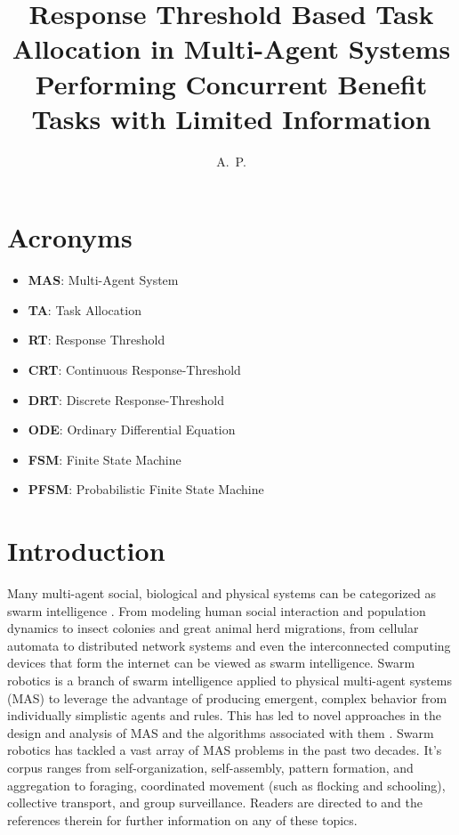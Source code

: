 \documentclass[defaultstyle,12pt]{thesis}
\title{Response Threshold Based Task Allocation in Multi-Agent Systems Performing Concurrent Benefit Tasks with Limited Information}
\author{A.~P.}{Kanakia}
\begin{document}
\chapter*{Acronyms}
\begin{itemize}
	\item \textbf{MAS}:  Multi-Agent System
	\item \textbf{TA}:   Task Allocation
	\item \textbf{RT}:   Response Threshold
	\item \textbf{CRT}:  Continuous Response-Threshold
	\item \textbf{DRT}:  Discrete Response-Threshold
	\item \textbf{ODE}:  Ordinary Differential Equation
	\item \textbf{FSM}:  Finite State Machine
	\item \textbf{PFSM}: Probabilistic Finite State Machine
\end{itemize}

\chapter{Introduction}
Many multi-agent social, biological and physical systems can be categorized as swarm intelligence \cite{Beni2005}. From modeling human social interaction and population dynamics to insect colonies and great animal herd migrations, from cellular automata to distributed network systems and even the interconnected computing devices that form the internet can be viewed as swarm intelligence. Swarm robotics \cite{Sahin2005} is a branch of swarm intelligence applied to physical multi-agent systems (MAS) to leverage the advantage of producing emergent, complex behavior from individually simplistic agents and rules. This has led to novel approaches in the design and analysis of MAS and the algorithms associated with them \cite{Brambilla2013}. Swarm robotics has tackled a vast array of MAS problems in the past two decades. It's corpus ranges from self-organization, self-assembly, pattern formation, and aggregation to foraging, coordinated movement (such as flocking and schooling), collective transport, and group surveillance. Readers are directed to \cite{Bayindir2007} and the references therein for further information on any of these topics. 
\end{document}
